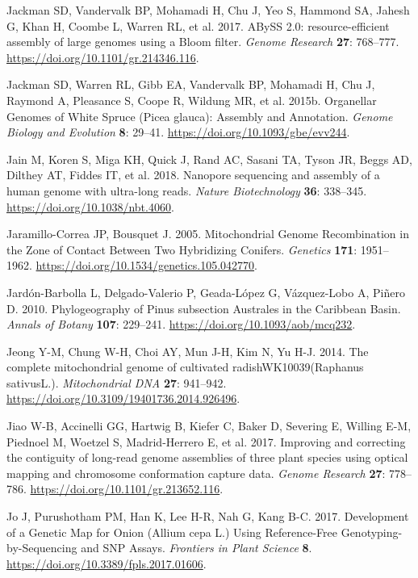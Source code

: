 \documentclass[
  12pt,
  oneside,
  openany]{book}
\begin{document}
\leavevmode\hypertarget{ref-Jackman_2017}{}%
Jackman SD, Vandervalk BP, Mohamadi H, Chu J, Yeo S, Hammond SA, Jahesh G, Khan H, Coombe L, Warren RL, et al. 2017. ABySS 2.0: resource-efficient assembly of large genomes using a Bloom filter. \emph{Genome Research} \textbf{27}: 768--777. \url{https://doi.org/10.1101/gr.214346.116}.

\leavevmode\hypertarget{ref-Jackman_2015}{}%
Jackman SD, Warren RL, Gibb EA, Vandervalk BP, Mohamadi H, Chu J, Raymond A, Pleasance S, Coope R, Wildung MR, et al. 2015b. Organellar Genomes of White Spruce (Picea glauca): Assembly and Annotation. \emph{Genome Biology and Evolution} \textbf{8}: 29--41. \url{https://doi.org/10.1093/gbe/evv244}.

\leavevmode\hypertarget{ref-Jain_2018}{}%
Jain M, Koren S, Miga KH, Quick J, Rand AC, Sasani TA, Tyson JR, Beggs AD, Dilthey AT, Fiddes IT, et al. 2018. Nanopore sequencing and assembly of a human genome with ultra-long reads. \emph{Nature Biotechnology} \textbf{36}: 338--345. \url{https://doi.org/10.1038/nbt.4060}.

\leavevmode\hypertarget{ref-Jaramillo_Correa_2005}{}%
Jaramillo-Correa JP, Bousquet J. 2005. Mitochondrial Genome Recombination in the Zone of Contact Between Two Hybridizing Conifers. \emph{Genetics} \textbf{171}: 1951--1962. \url{https://doi.org/10.1534/genetics.105.042770}.

\leavevmode\hypertarget{ref-Jard_n_Barbolla_2010}{}%
Jardón-Barbolla L, Delgado-Valerio P, Geada-López G, Vázquez-Lobo A, Piñero D. 2010. Phylogeography of Pinus subsection Australes in the Caribbean Basin. \emph{Annals of Botany} \textbf{107}: 229--241. \url{https://doi.org/10.1093/aob/mcq232}.

\leavevmode\hypertarget{ref-Jeong_2014}{}%
Jeong Y-M, Chung W-H, Choi AY, Mun J-H, Kim N, Yu H-J. 2014. The complete mitochondrial genome of cultivated radishWK10039(Raphanus sativusL.). \emph{Mitochondrial DNA} \textbf{27}: 941--942. \url{https://doi.org/10.3109/19401736.2014.926496}.

\leavevmode\hypertarget{ref-Jiao_2017}{}%
Jiao W-B, Accinelli GG, Hartwig B, Kiefer C, Baker D, Severing E, Willing E-M, Piednoel M, Woetzel S, Madrid-Herrero E, et al. 2017. Improving and correcting the contiguity of long-read genome assemblies of three plant species using optical mapping and chromosome conformation capture data. \emph{Genome Research} \textbf{27}: 778--786. \url{https://doi.org/10.1101/gr.213652.116}.

\leavevmode\hypertarget{ref-Jo_2017}{}%
Jo J, Purushotham PM, Han K, Lee H-R, Nah G, Kang B-C. 2017. Development of a Genetic Map for Onion (Allium cepa L.) Using Reference-Free Genotyping-by-Sequencing and SNP Assays. \emph{Frontiers in Plant Science} \textbf{8}. \url{https://doi.org/10.3389/fpls.2017.01606}.
\end{document}
